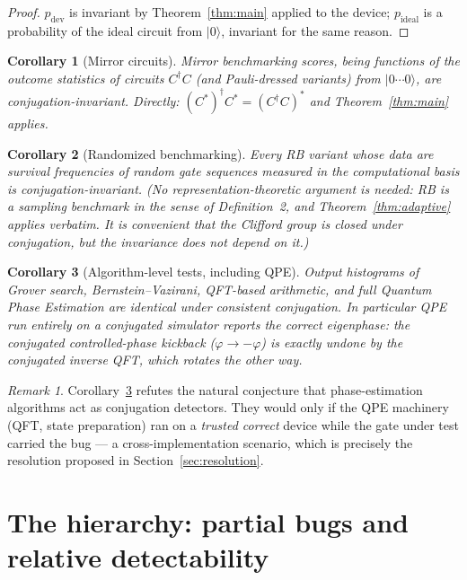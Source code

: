 \documentclass[11pt]{article}
\newtheorem{corollary}{Corollary}
\theoremstyle{definition}
\theoremstyle{remark}
\newtheorem{remark}{Remark}
\newcommand{\ket}[1]{\lvert #1 \rangle}
\begin{document}
\begin{proof}
$p_{\mathrm{dev}}$ is invariant by Theorem~\ref{thm:main} applied to the
device; $p_{\mathrm{ideal}}$ is a probability of the ideal circuit from
$\ket{0}$, invariant for the same reason.
\end{proof}

\begin{corollary}[Mirror circuits]\label{cor:mirror}
Mirror benchmarking scores, being functions of the outcome statistics of
circuits $C^{\dagger} C$ (and Pauli-dressed variants) from
$\ket{0\cdots0}$, are conjugation-invariant. Directly:
$(C^{*})^{\dagger} C^{*} = (C^{\dagger} C)^{*}$ and
Theorem~\ref{thm:main} applies.
\end{corollary}

\begin{corollary}[Randomized benchmarking]\label{cor:rb}
Every RB variant whose data are survival frequencies of random gate
sequences measured in the computational basis is conjugation-invariant.
(No representation-theoretic argument is needed: RB is a sampling
benchmark in the sense of Definition~2, and Theorem~\ref{thm:adaptive}
applies verbatim. It is convenient that the Clifford group is closed
under conjugation, but the invariance does not depend on it.)
\end{corollary}

\begin{corollary}[Algorithm-level tests, including QPE]\label{cor:qpe}
Output histograms of Grover search, Bernstein--Vazirani, QFT-based
arithmetic, and full Quantum Phase Estimation are identical under
consistent conjugation. In particular QPE run entirely on a conjugated
simulator reports the \emph{correct} eigenphase: the conjugated
controlled-phase kickback ($\varphi \to -\varphi$) is exactly undone by
the conjugated inverse QFT, which rotates the other way.
\end{corollary}

\begin{remark}
Corollary~\ref{cor:qpe} refutes the natural conjecture that
phase-estimation algorithms act as conjugation detectors. They would
only if the QPE machinery (QFT, state preparation) ran on a
\emph{trusted correct} device while the gate under test carried the bug
--- a cross-implementation scenario, which is precisely the resolution
proposed in Section~\ref{sec:resolution}.
\end{remark}

\section{The hierarchy: partial bugs and relative detectability}
\end{document}
